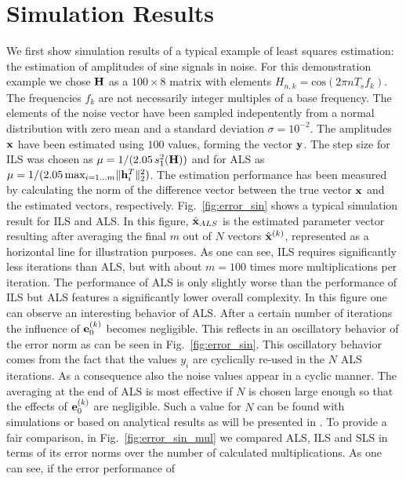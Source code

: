 \documentclass{article}
\begin{document}
\section{Simulation Results} \label{sec:sim_res} 
We first show simulation results of a typical example of least squares estimation: the estimation
of amplitudes of sine signals in noise. For this demonstration example we 
chose ${\bf H}$ as a $100 \times 8$ matrix 
with elements $H_{n,k} = \text{cos}(2 \pi n T_s f_k)$.
The frequencies $f_k$ are not necessarily integer multiples of a base frequency.
The elements of the noise vector have been 
sampled indepentently from a normal distribution with zero mean and a 
standard deviation $\sigma = 10^{-2}$. 
The amplitudes $\bf x$ 
have been estimated using $100$ values, forming the vector $\bf y$. 
The step size for ILS was chosen as $\mu=1/(2.05\,s_1^2({\bf H}))$ and
for ALS as $\mu=1/(2.05\,\text{max}_{i=1 \ldots m}{\|{\bf h}^T_{i}\|_2^2})$.
The estimation performance
has been measured by calculating the norm of the difference vector 
between the true vector $\bf x$ and the estimated vectors, respectively. Fig.~\ref{fig:error_sin}
shows a typical simulation result for ILS and ALS. 
In this figure, $\hat{\bf x}_{ALS}$ is the estimated parameter vector resulting 
after averaging the 
final $m$ out of $N$ vectors $\hat{\bf x}^{(k)}$, represented as a horizontal line for 
illustration purposes.
As one can see, ILS requires significantly less
iterations than ALS, but with about $m=100$ times more multiplications per iteration. 
The
performance of ALS is only slightly worse than the performance of ILS
but ALS features a significantly lower overall complexity. 
In this figure one can observe an interesting behavior of ALS. After a certain number of iterations 
the influence of ${\bf e}_0^{(k)}$ becomes negligible. 
This reflects in an oscillatory behavior 
of the error norm as can be seen in Fig.~\ref{fig:error_sin}.
This oscillatory behavior comes from the fact that the values $y_i$ are cyclically 
re-used in the $N$ ALS iterations. As a consequence also the noise values appear
in a cyclic manner.
The averaging at the end of ALS is most effective if $N$ is chosen large enough
so that the effects of ${\bf e}_0^{(k)}$ are negligible. Such a value for $N$ can be found with 
simulations or based on analytical results as will be presented in \cite{journal}.
To provide a fair comparison, in Fig.~\ref{fig:error_sin_mul} we compared ALS, ILS and SLS in 
terms of its error norms over the number of
calculated multiplications. 
As one can see, if the error performance of 
\end{document}
